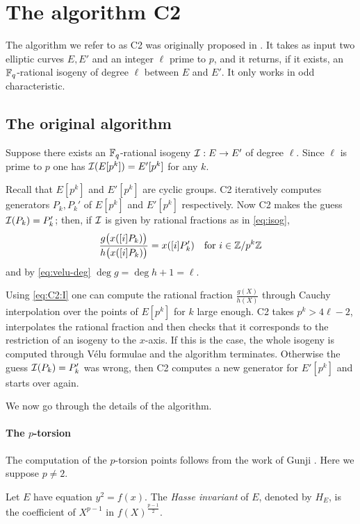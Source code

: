 \section{The algorithm C2}
\label{sec:C2}

The algorithm we refer to as C2 was originally proposed in
\cite{Cou96}. It takes as input two elliptic curves $E, E'$ and an
integer $\ell$ prime to $p$, and it returns, if it exists, an
$\mathbb{F}_q$-rational isogeny of degree $\ell$ between $E$ and $E'$. It only
works in odd characteristic.

\subsection{The original algorithm}
Suppose there exists an $\mathbb{F}_q$-rational isogeny
$\mathcal{I}:E\rightarrow E'$ of degree $\ell$. Since $\ell$ is prime to $p$
one has $\mathcal{I}(E[p^k]) = E'[p^k]$ for any $k$.

Recall that $E[p^k]$ and $E'[p^k]$ are cyclic groups. C2 iteratively
computes generators $P_k,P_k'$ of $E[p^k]$ and $E'[p^k]$
respectively. Now C2 makes the guess $\mathcal{I}(P_k) = P_k'$; then, if $\mathcal{I}$
is given by rational fractions as in \eqref{eq:isog},
\begin{equation}
  \label{eq:C2:I}
  \frac{g\bigl(x([i]P_k)\bigr)}{h\bigl(x([i]P_k)\bigr)} = x([i]P_k')
  \quad\text{for $i\in\mathbb{Z}/p^k\mathbb{Z}$} 
\end{equation}
and by \eqref{eq:velu-deg} $\deg g = \deg h + 1 = \ell$.

Using \eqref{eq:C2:I} one can compute the rational fraction
$\frac{g(X)}{h(X)}$ through Cauchy interpolation over the points of
$E[p^k]$ for $k$ large enough. C2 takes $p^k > 4\ell - 2$,
interpolates the rational fraction and then checks that it corresponds
to the restriction of an isogeny to the $x$-axis. If this is the case,
the whole isogeny is computed through Vélu formulae and the algorithm
terminates. Otherwise the guess $\mathcal{I}(P_k) = P_k'$ was wrong, then C2
computes a new generator for $E'[p^k]$ and starts over again.

We now go through the details of the algorithm.

\paragraph{The $p$-torsion}
The computation of the $p$-torsion points follows from the work of
Gunji \cite{Gun76}. Here we suppose $p\ne2$.

\begin{definition}
  \label{def:hasse}
  Let $E$ have equation $y^2 = f(x)$. The \emph{Hasse invariant} of
  $E$, denoted by $H_E$, is the coefficient of $X^{p-1}$ in
  $f(X)^{\frac{p-1}{2}}$.
\end{definition}

